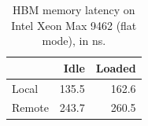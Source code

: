 \begin{table}[t]
  \centering
  \caption{HBM memory latency on Intel Xeon Max 9462 (flat mode), in ns.}
  \label{tbl:hbm-latency}
  \begin{tabular}{|l|r|r|}
    \hline
           & \textbf{Idle} & \textbf{Loaded} \\
    \hline
    Local  & 135.5 & 162.6 \\
    \hline
    Remote & 243.7 & 260.5 \\
    \hline
  \end{tabular}
\end{table}

